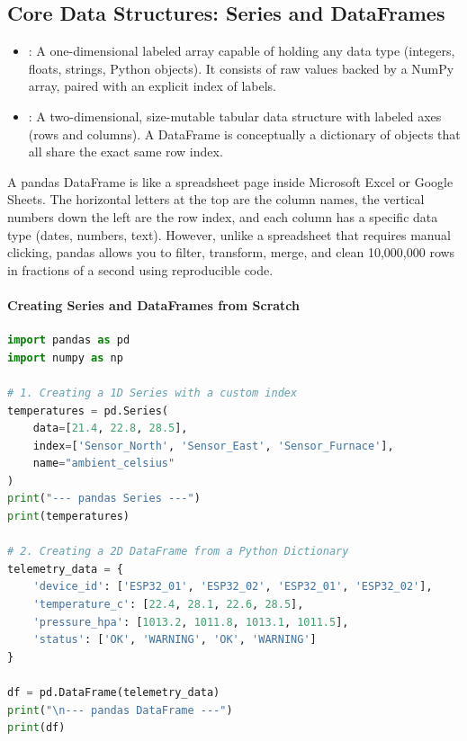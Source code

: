 \subsection{Core Data Structures: Series and DataFrames}

\begin{keyidea}
\begin{itemize}
    \item \textbf{}: A one-dimensional labeled array capable of holding any data type (integers, floats, strings, Python objects). It consists of raw values backed by a NumPy array, paired with an explicit index of labels.
    \item \textbf{}: A two-dimensional, size-mutable tabular data structure with labeled axes (rows and columns). A DataFrame is conceptually a dictionary of  objects that all share the exact same row index.
\end{itemize}
\end{keyidea}

\begin{analogy}
A pandas DataFrame is like a spreadsheet page inside Microsoft Excel or Google Sheets. The horizontal letters at the top are the column names, the vertical numbers down the left are the row index, and each column has a specific data type (dates, numbers, text). However, unlike a spreadsheet that requires manual clicking, pandas allows you to filter, transform, merge, and clean 10,000,000 rows in fractions of a second using reproducible code.
\end{analogy}

\paragraph{Creating Series and DataFrames from Scratch}
\begin{lstlisting}[language=Python]
import pandas as pd
import numpy as np

# 1. Creating a 1D Series with a custom index
temperatures = pd.Series(
    data=[21.4, 22.8, 28.5], 
    index=['Sensor_North', 'Sensor_East', 'Sensor_Furnace'],
    name="ambient_celsius"
)
print("--- pandas Series ---")
print(temperatures)

# 2. Creating a 2D DataFrame from a Python Dictionary
telemetry_data = {
    'device_id': ['ESP32_01', 'ESP32_02', 'ESP32_01', 'ESP32_02'],
    'temperature_c': [22.4, 28.1, 22.6, 28.5],
    'pressure_hpa': [1013.2, 1011.8, 1013.1, 1011.5],
    'status': ['OK', 'WARNING', 'OK', 'WARNING']
}

df = pd.DataFrame(telemetry_data)
print("\n--- pandas DataFrame ---")
print(df)
\end{lstlisting}


